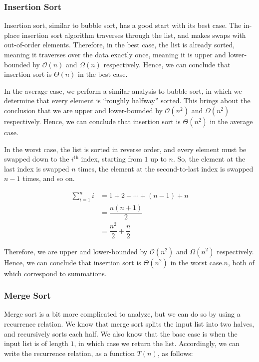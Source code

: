 \subsubsection*{Insertion Sort}
Insertion sort, similar to bubble sort, has a good start with its best case. The in-place insertion sort algorithm traverses through the list, and makes swaps with out-of-order elements. Therefore, in the best case, the list is already sorted, meaning it traverses over the data exactly once, meaning it is upper and lower-bounded by $\mathcal{O}(n)$ and $\Omega(n)$ respectively. Hence, we can conclude that insertion sort is $\Theta(n)$ in the best case.

In the average case, we perform a similar analysis to bubble sort, in which we determine that every element is ``roughly halfway'' sorted. This brings about the conclusion that we are upper and lower-bounded by $\mathcal{O}(n^2)$ and $\Omega(n^2)$ respectively. Hence, we can conclude that insertion sort is $\Theta(n^2)$ in the average case.

In the worst case, the list is sorted in reverse order, and every element must be swapped down to the $i^\text{th}$ index, starting from $1$ up to $n$. So, the element at the last index is swapped $n$ times, the element at the second-to-last index is swapped $n - 1$ times, and so on. 

\begin{align*}
  \sum_{i=1}^{n}i &= 1 + 2 + \cdots + (n - 1) + n\\
  &= \dfrac{n(n + 1)}{2}\\
  &= \dfrac{n^2}{2} + \dfrac{n}{2}
\end{align*}

Therefore, we are upper and lower-bounded by $\mathcal{O}(n^2)$ and $\Omega(n^2)$ respectively. Hence, we can conclude that insertion sort is $\Theta(n^2)$ in the worst case.$n$, both of which correspond to summations. 

\subsubsection*{Merge Sort}
Merge sort is a bit more complicated to analyze, but we can do so by using a recurrence relation. We know that merge sort splits the input list into two halves, and recursively sorts each half. We also know that the base case is when the input list is of length $1$, in which case we return the list. Accordingly, we can write the recurrence relation, as a function $T(n)$, as follows:

